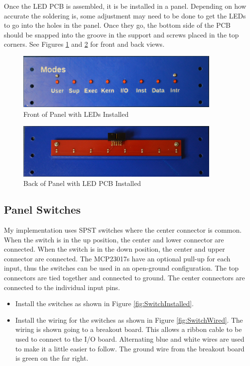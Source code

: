 \documentclass[10pt, openany]{book}
\begin{document}
Once the LED PCB is assembled, it is be installed in a panel.  Depending on how accurate the soldering is, some adjustment may need to be done to get the LEDs to go into the holes in the panel.  Once they go, the bottom side of the PCB should be snapped into the groove in the support and screws placed in the top corners.  See Figures \ref{fig:PanelFront} and \ref{fig:PanelBack} for front and back views.

\begin{figure}[ht!]
  \centering
  \includegraphics[width=0.9\textwidth]{../Pict/Panel-Front.jpg}
  \caption{Front of Panel with LEDs Installed}
  \label{fig:PanelFront}
\end{figure}

\begin{figure}[ht!]
  \centering
  \includegraphics[width=0.9\textwidth]{../Pict/Panel-Back.jpg}
  \caption{Back of Panel with LED PCB Installed}
  \label{fig:PanelBack}
\end{figure}

\clearpage
\subsection{Panel Switches}
My implementation uses SPST switches where the center connector is common.  When the switch is in the up position, the center and lower connector are connected.  When the switch is in the down position, the center and upper connector are connected.  The MCP23017s have an optional pull-up for each input, thus the switches can be used in an open-ground configuration.  The top connectors are tied together and connected to ground.  The center connectors are connected to the individual input pins.
\begin{itemize}
  \item Install the switches as shown in Figure \ref{fig:SwitchInstalled}.
  \item Install the wiring for the switches as shown in Figure \ref{fig:SwitchWired}.  The wiring is shown going to a breakout board.  This allows a ribbon cable to be used to connect to the I/O board.  Alternating blue and white wires are used to make it a little easier to follow.  The ground wire from the breakout board is green on the far right.
\end{itemize}
\end{document}
